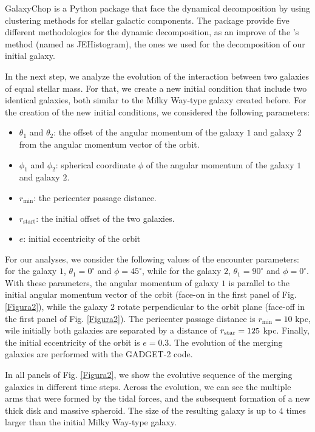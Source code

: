 \documentclass[baaa]{baaa}
\begin{document}
GalaxyChop is a Python package that face the dynamical decomposition by using clustering methods for stellar galactic components. The package provide five different methodologies for the dynamic decomposition, as an improve of the \cite{Abadi_2003_ApJ_597_21A}'s method (named as JEHistogram), the ones we used for the decomposition of our initial galaxy.  

In the next step, we analyze the evolution of the interaction between two galaxies of equal stellar mass. For that, we create a new initial condition that include two identical galaxies, both similar to the Milky Way-type galaxy created before. For the creation of the new initial conditions, we considered the following parameters:

\begin{itemize}
    \item $\theta_1$ and $\theta_2$: the offset of the angular momentum of the galaxy $1$ and galaxy $2$ from the angular momentum vector of the orbit.
    \item $\phi_1$ and $\phi_2$: spherical coordinate $\phi$ of the angular momentum of the galaxy $1$ and galaxy $2$.
    \item $r_{\text{min}}$: the pericenter passage distance.
    \item $r_{\text{start}}$: the initial offset of the two galaxies.
    \item $e$: initial eccentricity of the orbit 
\end{itemize}

\noindent
For our analyses, we consider the following values of the encounter parameters: for the galaxy $1$, $\theta_1 = 0^{\circ}$ and $\phi = 45^{\circ}$, while for the galaxy $2$, $\theta_1 = 90^{\circ}$ and $\phi = 0^{\circ}$. With these parameters, the angular momentum of galaxy $1$ is parallel to the initial angular momentum vector of the orbit (face-on in the first panel of Fig. \ref{Figura2}), while the galaxy $2$ rotate perpendicular to the orbit plane (face-off in the first panel of Fig. \ref{Figura2}). The pericenter passage distance is $r_{\text{min}} = 10$ kpc, wile initially both galaxies are separated by a distance of $r_{\rm star} = 125$ kpc. Finally, the initial eccentricity of the orbit is $e = 0.3$. The evolution of the merging galaxies are performed with the GADGET-2 code.

In all panels of Fig. \ref{Figura2}, we show the evolutive sequence of the merging galaxies in different time steps. Across the evolution, we can see the multiple arms that were formed by the tidal forces, and the subsequent formation of a new thick disk and massive spheroid. The size of the resulting galaxy is up to $4$ times larger than the initial Milky Way-type galaxy. 
\end{document}
